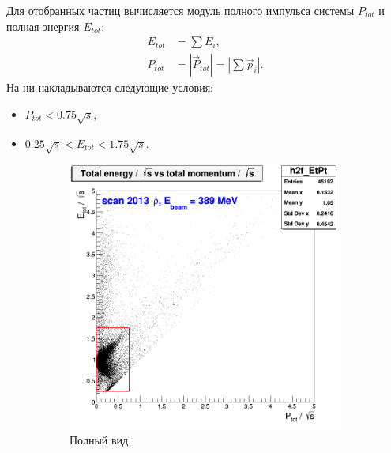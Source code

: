 Для отобранных частиц вычисляется модуль полного импульса системы $P_{tot}$ и полная энергия $E_{tot}$:
\begin{align}
    E_{tot} &= \sum E_i , \\
    P_{tot} &= \left| \vec{P}_{tot} \right| = \left| \sum \vec{p}_i \right| .
\end{align}
На ни накладываются следующие условия:
\begin{itemize}
    \item $P_{tot} < 0.75 \sqrt{s}$,
    \item $0.25 \sqrt{s} < E_{tot} < 1.75 \sqrt{s}$.
\end{itemize}
\begin{figure}[htbp]
    \centering
    \begin{subfigure}[b]{0.45\textwidth}
        \includegraphics[width=\textwidth]{img/h2f_EtPt.png}
        \caption{Полный вид.}
        \label{fig:EtPt_full}
    \end{subfigure}
    ~
    \begin{subfigure}[b]{0.45\textwidth}

\end{subfigure}
\end{figure}
